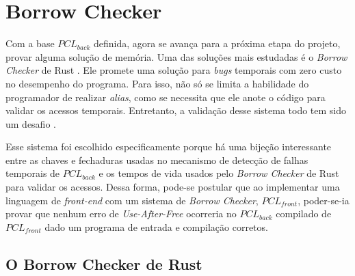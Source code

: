 \chapter{Borrow Checker}
\label{chap4}

Com a base $PCL_{back}$ definida, agora se avança para a próxima etapa do projeto, provar alguma solução de memória. Uma das soluções mais estudadas é o \emph{Borrow Checker} de Rust \cite{RUSTBOOK}. Ele promete uma solução para \emph{bugs} temporais com zero custo no desempenho do programa. Para isso, não só se limita a habilidade do programador de realizar \emph{alias}, como se necessita que ele anote o código para validar os acessos temporais. Entretanto, a validação desse sistema todo tem sido um desafio \cite{RUSTBELT,RUSTSYMBOLIC}.


Esse sistema foi escolhido especificamente porque há uma bijeção interessante entre as chaves e fechaduras usadas no mecanismo de detecção de falhas temporais de $PCL_{back}$ e os tempos de vida usados pelo \emph{Borrow Checker} de Rust para validar os acessos. Dessa forma, pode-se postular que ao implementar uma linguagem de \emph{front-end} com um sistema de \emph{Borrow Checker}, $PCL_{front}$, poder-se-ia provar que nenhum erro de \emph{Use-After-Free} ocorreria no $PCL_{back}$ compilado de $PCL_{front}$ dado um programa de entrada e compilação corretos.

\section{O Borrow Checker de Rust}

